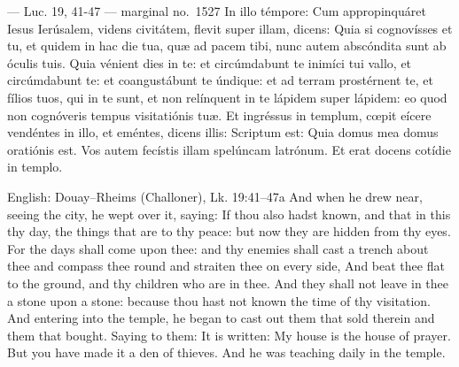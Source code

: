 \begin{appointedlatin}{ --- Luc. 19, 41-47 --- marginal no.\ 1527}
In illo témpore: Cum appropinquáret Iesus Ierúsalem, videns civitátem, flevit
super illam, dicens: Quia si cognovísses et tu, et quidem in hac die tua, quæ
ad pacem tibi, nunc autem abscóndita sunt ab óculis tuis. Quia vénient dies in
te: et circúmdabunt te inimíci tui vallo, et circúmdabunt te: et coangustábunt
te úndique: et ad terram prostérnent te, et fílios tuos, qui in te sunt, et non
relínquent in te lápidem super lápidem: eo quod non cognóveris tempus
visitatiónis tuæ. Et ingréssus in templum, cœpit eícere vendéntes in illo, et
eméntes, dicens illis: Scriptum est: Quia domus mea domus oratiónis est. Vos
autem fecístis illam spelúncam latrónum. Et erat docens cotídie in templo.
\end{appointedlatin}

\begin{namedtranslation}{English: Douay--Rheims (Challoner), Lk. 19:41--47a}
And when he drew near, seeing the city, he wept over it, saying: If thou also
hadst known, and that in this thy day, the things that are to thy peace: but
now they are hidden from thy eyes. For the days shall come upon thee: and thy
enemies shall cast a trench about thee and compass thee round and straiten
thee on every side, And beat thee flat to the ground, and thy children who are
in thee. And they shall not leave in thee a stone upon a stone: because thou
hast not known the time of thy visitation. And entering into the temple, he
began to cast out them that sold therein and them that bought. Saying to them:
It is written: My house is the house of prayer. But you have made it a den of
thieves. And he was teaching daily in the temple.
\end{namedtranslation}



